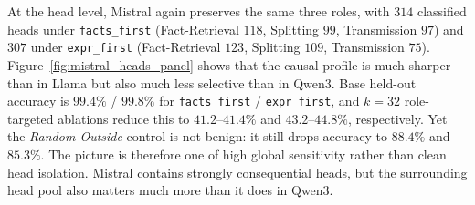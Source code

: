 \documentclass[11pt]{article}
\begin{document}
%

At the head level, Mistral again preserves the same three roles, with $314$ classified heads under \texttt{facts\_first} (Fact-Retrieval $118$, Splitting $99$, Transmission $97$) and $307$ under \texttt{expr\_first} (Fact-Retrieval $123$, Splitting $109$, Transmission $75$). Figure~\ref{fig:mistral_heads_panel} shows that the causal profile is much sharper than in Llama but also much less selective than in Qwen3. Base held-out accuracy is $99.4\%$ / $99.8\%$ for \texttt{facts\_first} / \texttt{expr\_first}, and $k=32$ role-targeted ablations reduce this to $41.2$--$41.4\%$ and $43.2$--$44.8\%$, respectively. Yet the \textit{Random-Outside} control is not benign: it still drops accuracy to $88.4\%$ and $85.3\%$. The picture is therefore one of high global sensitivity rather than clean head isolation. Mistral contains strongly consequential heads, but the surrounding head pool also matters much more than it does in Qwen3.
\end{document}
